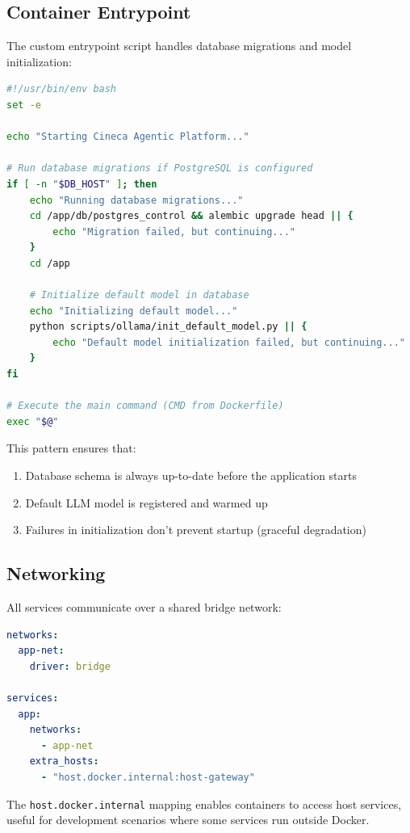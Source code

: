 \subsection{Container Entrypoint}

The custom entrypoint script handles database migrations and model initialization:

\begin{lstlisting}[language=bash, caption=docker-entrypoint.sh]
#!/usr/bin/env bash
set -e

echo "Starting Cineca Agentic Platform..."

# Run database migrations if PostgreSQL is configured
if [ -n "$DB_HOST" ]; then
    echo "Running database migrations..."
    cd /app/db/postgres_control && alembic upgrade head || {
        echo "Migration failed, but continuing..."
    }
    cd /app
    
    # Initialize default model in database
    echo "Initializing default model..."
    python scripts/ollama/init_default_model.py || {
        echo "Default model initialization failed, but continuing..."
    }
fi

# Execute the main command (CMD from Dockerfile)
exec "$@"
\end{lstlisting}

This pattern ensures that:
\begin{enumerate}
    \item Database schema is always up-to-date before the application starts
    \item Default LLM model is registered and warmed up
    \item Failures in initialization don't prevent startup (graceful degradation)
\end{enumerate}

\subsection{Networking}

All services communicate over a shared bridge network:

\begin{lstlisting}[language=yaml, caption=Network configuration]
networks:
  app-net:
    driver: bridge

services:
  app:
    networks:
      - app-net
    extra_hosts:
      - "host.docker.internal:host-gateway"
\end{lstlisting}

The \texttt{host.docker.internal} mapping enables containers to access host services, useful for development scenarios where some services run outside Docker.

